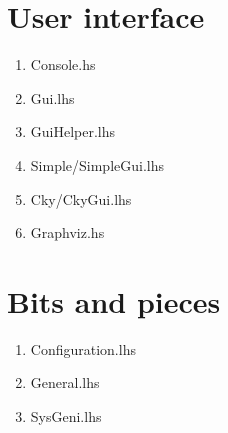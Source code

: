 \documentclass[a4paper,11pt]{report}
\begin{document}
\section{User interface}

\begin{enumerate}
\item{Console.hs}
\item{Gui.lhs}
\item{GuiHelper.lhs}
\item{Simple/SimpleGui.lhs}
\item{Cky/CkyGui.lhs}
\item{Graphviz.hs}
\end{enumerate}

\section{Bits and pieces}

\begin{enumerate}
\item{Configuration.lhs}
\item{General.lhs}
\item{SysGeni.lhs}
\end{enumerate}

{


}
\end{document}
